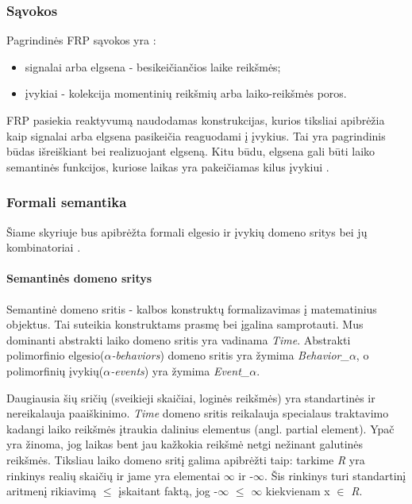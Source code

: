 \subsubsection{Sąvokos}

Pagrindinės FRP sąvokos yra \cite{ElliottHudak97:Fran}:

\begin{itemize}

	\item signalai arba elgsena - besikeičiančios laike reikšmės;

	\item įvykiai - kolekcija momentinių reikšmių arba laiko-reikšmės poros.

\end{itemize}

FRP pasiekia reaktyvumą naudodamas konstrukcijas, kurios tiksliai apibrėžia kaip signalai arba elgsena pasikeičia reaguodami į įvykius. Tai yra pagrindinis būdas išreiškiant bei realizuojant elgseną. Kitu būdu, elgsena gali būti laiko semantinės funkcijos, kuriose laikas yra pakeičiamas kilus įvykiui \cite{Nilsson:2002:FRP:581690.581695}.


\subsubsection{Formali semantika}

Šiame skyriuje bus apibrėžta formali elgesio ir įvykių domeno sritys bei jų kombinatoriai \cite{ElliottHudak97:Fran}.

\paragraph{Semantinės domeno sritys}

Semantinė domeno sritis - kalbos konstruktų formalizavimas į matematinius objektus. Tai suteikia konstruktams prasmę bei įgalina samprotauti. Mus dominanti abstrakti laiko domeno sritis yra vadinama \textit{Time}. Abstrakti polimorfinio elgesio(\textit{$\alpha$-behaviors}) domeno sritis yra žymima \textit{Behavior_{\(\alpha\)}}, o polimorfinių įvykių(\textit{$\alpha$-events}) yra žymima \textit{Event_{\(\alpha\)}}.

Daugiausia šių sričių (sveikieji skaičiai, loginės reikšmės) yra standartinės ir nereikalauja paaiškinimo. \textit{Time} domeno sritis reikalauja specialaus traktavimo kadangi laiko reikšmės įtraukia dalinius elementus (angl. partial element). Ypač yra žinoma, jog laikas bent jau kažkokia reikšmė netgi nežinant galutinės reikšmės. Tiksliau laiko domeno sritį galima apibrėžti taip: tarkime \textit{R} yra rinkinys realių skaičių ir jame yra elementai \(\infty\)  ir -\(\infty\). Šis rinkinys turi standartinį aritmenį rikiavimą \(\leq\) įskaitant faktą, jog -\(\infty\) \(\leq\) \(\infty\) kiekvienam x \(\in\) \textit{R}.

